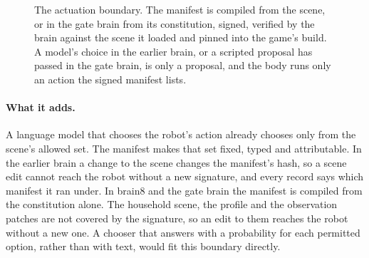 \begin{figure}[t]
\centering

\caption{The actuation boundary. The manifest is compiled from the scene, or in the gate brain from
its constitution, signed, verified by the brain against the scene it loaded and pinned into the
game's build. A model's choice in the earlier brain, or a scripted proposal \deme{} has passed in
the gate brain, is only a proposal, and the body runs only an action the signed manifest lists.}
\label{fig:manifest}
\end{figure}

\paragraph{What it adds.} A language model that chooses the robot's action already chooses only
from the scene's allowed set.
The manifest makes that set fixed, typed and attributable.
In the earlier brain a change to the scene changes the manifest's hash, so a scene edit cannot
reach the robot without a new signature, and every record says which manifest it ran under.
In brain8 and the gate brain the manifest is compiled from the constitution alone.
The household scene, the \deme{} profile and the observation patches are not covered by the
signature, so an edit to them reaches the robot without a new one.
A chooser that answers with a probability for each permitted option, rather than with text, would
fit this boundary directly.

